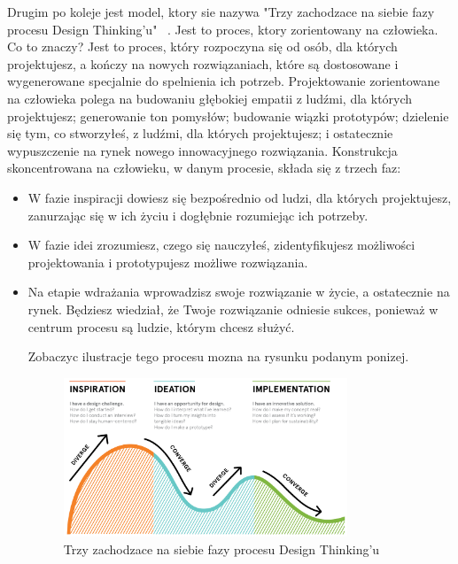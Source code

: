\documentclass[a4paper,titleauthor]{mwart}
\begin{document}
Drugim po koleje jest model, ktory sie nazywa "Trzy zachodzace na siebie fazy procesu Design Thinking'u" ~\cite{Proces2}. Jest to proces, ktory zorientowany na człowieka. \newline \newline 
Co to znaczy? \newline \newline
Jest to proces, który rozpoczyna się od osób, dla których projektujesz, a kończy na nowych rozwiązaniach, które są dostosowane i wygenerowane specjalnie do spelnienia ich potrzeb. Projektowanie zorientowane na człowieka polega na budowaniu głębokiej empatii z ludźmi, dla których projektujesz; generowanie ton pomysłów; budowanie wiązki prototypów; dzielenie się tym, co stworzyłeś, z ludźmi, dla których projektujesz; i ostatecznie wypuszczenie na rynek nowego innowacyjnego rozwiązania. \newline \newline
Konstrukcja skoncentrowana na człowieku, w danym procesie, składa się z trzech faz:\newline
 \begin{itemize}
 \item W fazie inspiracji dowiesz się bezpośrednio od ludzi, dla których projektujesz, zanurzając się w ich życiu i dogłębnie rozumiejąc ich potrzeby. 
 \item W fazie idei zrozumiesz, czego się nauczyłeś, zidentyfikujesz możliwości projektowania i prototypujesz możliwe rozwiązania. 
 \item Na etapie wdrażania wprowadzisz swoje rozwiązanie w życie, a ostatecznie na rynek. Będziesz wiedział, że Twoje rozwiązanie odniesie sukces, ponieważ w centrum procesu są ludzie, którym chcesz służyć.
 
 Zobaczyc ilustracje tego procesu mozna na rysunku podanym ponizej.
 
 \begin{figure}[h]
 	\centering
 	\includegraphics[width=0.8\textwidth]{2}
 	\caption{Trzy zachodzace na siebie fazy procesu Design Thinking'u}
 \end{figure}
 
\end{itemize}
\end{document}
